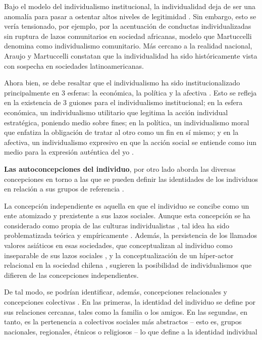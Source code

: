 \documentclass[12pt,twoside]{templates/facsothesis}
\begin{document}
Bajo el modelo del individualismo institucional, la individualidad deja de ser una anomalía para pasar a ostentar altos niveles de legitimidad \citep{martuccelli2018}. Sin embargo, esto se vería tensionado, por ejemplo, por la acentuación de conductas individualizadas sin ruptura de lazos comunitarios en sociedad africanas, modelo que Martuccelli \citeyearpar{martuccelli2018} denomina como individualismo comunitario. Más cercano a la realidad nacional, Araujo y Martuccelli \citeyearpar{araujo2020a} constatan que la individualidad ha sido históricamente vista con sospecha en sociedades latinoamericanas.

Ahora bien, se debe resaltar que el individualismo ha sido institucionalizado principalmente en 3 esferas: la económica, la política y la afectiva \citep{cortois2018, martuccelli2018}. Esto se refleja en la existencia de 3 guiones para el individualismo institucional; en la esfera económica, un individualismo utilitario que legitima la acción individual estratégica, poniendo medio sobre fines; en la política, un individualismo moral que enfatiza la obligación de tratar al otro como un fin en sí mismo; y en la afectiva, un individualismo expresivo en que la acción social se entiende como iun medio para la expresión auténtica del yo \citep{cortois2018}.

\textbf{Las autoconcepciones del individuo}, por otro lado aborda las diversas concepciones en torno a las que se pueden definir las identidades de los individuos en relación a sus grupos de referencia \citep{brewer2007}.

La concepción independiente es aquella en que el individuo se concibe como un ente atomizado y prexistente a sus lazos sociales. Aunque esta concepción se ha considerado como propia de las culturas individualistas \citep{benavides2020, cross2011}, tal idea ha sido problematizada teórica \citep{voronov2002} y empíricamente \citep{benavides2020, kolstad2009}. Además, la persistencia de los llamados valores asiáticos en esas sociedades, que conceptualizan al individuo como inseparable de sus lazos sociales \citep{zhai2022}, y la conceptualización de un híper-actor relacional en la sociedad chilena \citep{araujo2020}, sugieren la posibilidad de individualismos que difieren de las concepciones independientes.

De tal modo, se podrían identificar, además, concepciones relacionales y concepciones colectivas \citep{brewer2007}. En las primeras, la identidad del individuo se define por sus relaciones cercanas, tales como la familia o los amigos. En las segundas, en tanto, es la pertenencia a colectivos sociales más abstractos -- esto es, grupos nacionales, regionales, étnicos o religiosos -- lo que define a la identidad individual \citep{brewer2007}
\end{document}
